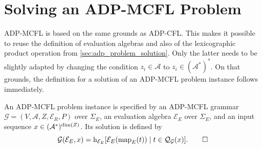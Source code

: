 \documentclass[
    a4paper,
    12pt,
    twoside,
    BCOR=12mm,
    parskip=half,
    chapterprefix,
    numbers=noenddot,
    bibliography=totoc
]{scrbook}
\begin{document}
\newpage
 
\section{Solving an ADP-MCFL Problem}

ADP-MCFL is based on the same grounds as ADP-CFL. This makes it possible to reuse the definition of evaluation algebras and also of the lexicographic product operation from \cref{sec:adp_problem_solution}. Only the latter needs to be slightly adapted by changing the condition $z_i \in \mathcal{A}$ to $z_i \in (\mathcal{A}^*)^*$. On that grounds, the definition for a solution of an ADP-MCFL problem instance follows immediately.

\begin{definition}
	{\sloppy
  An ADP-MCFL problem instance is specified by an ADP-MCFL grammar ${\mathcal{G}=(V,\mathcal{A},Z,\mathcal{E}_R,P)}$ over $\Sigma_E$, an evaluation algebra $\mathcal{E}_E$ over $\Sigma_E$, and an input sequence $x \in (\mathcal{A}^*)^{\mathrm{dim}(Z)}$. Its solution is defined by 
	\[ \mathcal{G}(\mathcal{E}_E,x) = \mathrm{h}_{\mathcal{E}_E}[\mathcal{E}_E(\mathrm{map}_E(t)) \mid t \in \mathcal{Q}_\mathcal{G}(x)]. \qedhere \] }
\end{definition}
\end{document}

